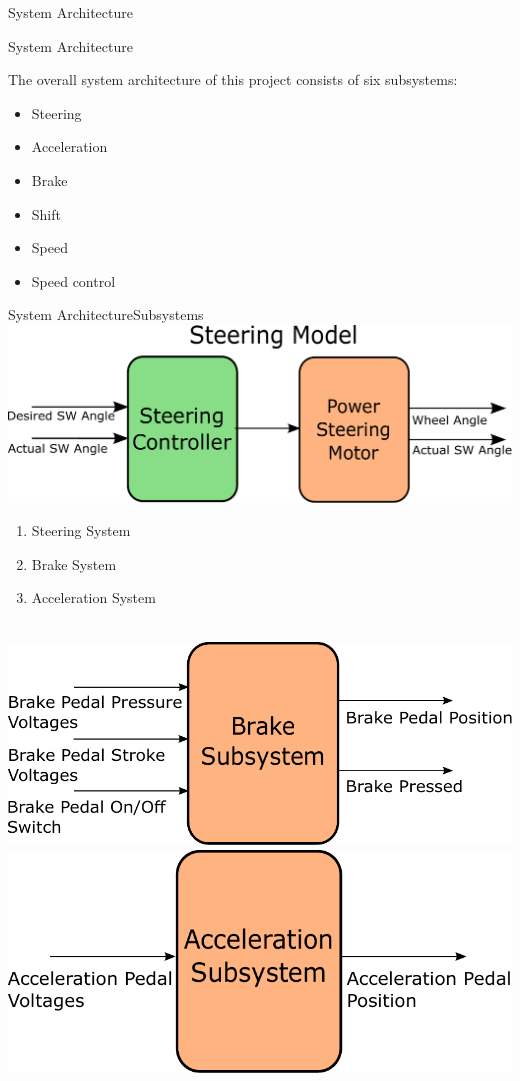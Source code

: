 \documentclass{beamer}
\begin{document}
\begin{frame}{System Architecture}{}
	\begin{block}{System Architecture}
    \begin{large}
      The overall system architecture of this project consists of six subsystems: 
      \begin{itemize}
          \item Steering
          \item Acceleration
          \item Brake %
          \item Shift %
          \item Speed %
          \item Speed control %
        \end{itemize} 
    \end{large}
  \end{block}
\end{frame}

\begin{frame}{System Architecture}{Subsystems}
	\centering \includegraphics[width=.45\linewidth]{figs/inkscape/steeringModelArchitecture}\quad%
	\centering \begin{minipage}[b][0.4\textheight][c]{.45\linewidth} \begin{enumerate} \item Steering System 			\item Brake System \item Acceleration System \end{enumerate} \end{minipage}\\[1em]
	\centering \includegraphics[width=.45\linewidth]{figs/inkscape/brakeModelArchitecture}\quad%
	\centering \includegraphics[width=.45\linewidth]{figs/inkscape/accelerationModelArchitecture}
\end{frame}
\end{document}
